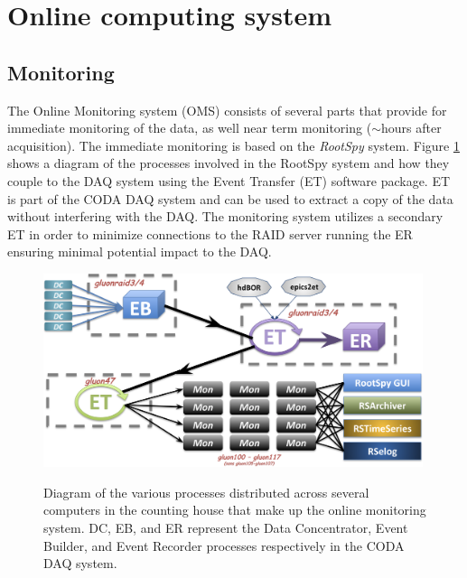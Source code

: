 
\section[Online computing system (David)]{Online computing system \label{sec:online}}
\subsection{Monitoring \label{sec:onlinemonitoring}}

The Online Monitoring system (OMS) consists of several parts that provide for immediate monitoring of the data, as well near term monitoring ($\sim$hours after acquisition). The immediate monitoring is based on the \textit{RootSpy}\cite{rootspy} system. Figure \ref{fig:online_monitoring_processes} shows a diagram of the processes involved in the RootSpy system and how they couple to the DAQ system using the Event Transfer (ET) software package. ET is part of the CODA DAQ system\cite{coda} and can be used to extract a copy of the data without interfering with the DAQ. The monitoring system utilizes a secondary ET in order to minimize connections to the RAID server running the ER ensuring minimal potential impact to the DAQ.

\begin{figure}[tbp]
\begin{center}
\includegraphics[width=0.99\textwidth]{figures/online_monitoring_processes.png}
\label{fig:online_monitoring_processes}
\caption{Diagram of the various processes distributed across several computers in the counting house that make up the online monitoring system. DC, EB, and ER represent the Data Concentrator, Event Builder, and Event Recorder processes respectively in the CODA DAQ system.}   
\end{center}  
\end{figure}

